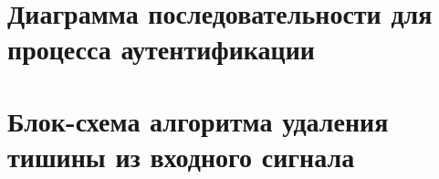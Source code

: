 \documentclass[12pt]{article}
\begin{document}
\begin{figure}[h!]
\end{figure}

\section{Диаграмма последовательности для процесса аутентификации}
\begin{figure}[hp!]
\end{figure}

\section{Блок-схема алгоритма удаления тишины из входного сигнала}
 
\begin{figure}[htp!]
\end{figure}
\end{document}
